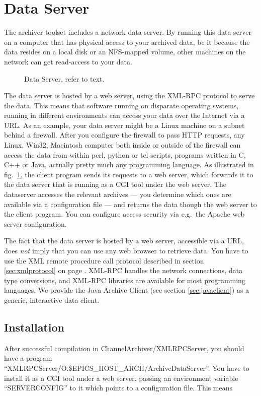 \section{Data Server} \label{sec:dataserver}
The archiver toolset includes a network data server.
By running this data server on a computer that has
physical access to your archived data, be it because the data resides
on a local disk or an NFS-mapped volume, other machines
on the network can get read-access to your data.

\begin{figure}[htb]
\begin{center}
\end{center}
\caption{\label{fig:dataserver}Data Server, refer to text.}
\end{figure}

\noindent The data server is hosted by a web server, using the XML-RPC
protocol to serve the data. This means that software running on
disparate operating systems, running in different environments can
access your data over the Internet via a URL. As an example, your data
server might be a Linux machine on a subnet behind a firewall. After
you configure the firewall to pass HTTP requests, any Linux, Win32,
Macintosh computer both inside or outside of the firewall can access
the data from within perl, python or tcl scripts, programs written in
C, C++ or Java, actually pretty much any programming language. As
illustrated in fig.~\ref{fig:dataserver}, the client program sends its
requests to a web server, which forwards it to the data server that is
running as a CGI tool under the web server. The dataserver accesses
the relevant archives --- you determine which ones are available via a
configuration file --- and returns the data though the web server to
the client program.  You can configure access security via e.g.\ the
Apache web server configuration.

\NOTE The fact that the data server is hosted by a web server,
accessible via a URL, does \emph{not} imply that you can use any web browser
to retrieve data. You have to use the XML remote procedure call
protocol described in section \ref{sec:xmlprotocol} on page
\pageref{sec:xmlprotocol}. XML-RPC handles the network connections,
data type conversions, and XML-RPC libraries are available for most
programming languages.
We provide the Java Archive Client (see section \ref{sec:javaclient})
as a generic, interactive data client. 

\subsection{Installation} %
After successful compilation in ChannelArchiver/XMLRPCServer, you should
have a program
``XMLRPCServer/O.\$EPICS\_HOST\_ARCH/ArchiveDataServer''.
You have to install it as a CGI tool under a web server, passing
an environment variable ``SERVERCONFIG'' to it which points
to a configuration file. This means


